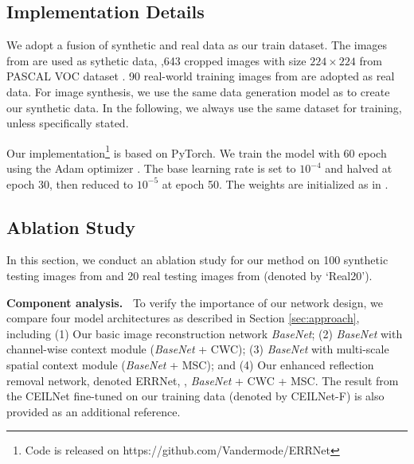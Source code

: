 \documentclass[10pt,twocolumn,letterpaper]{article}
\begin{document}
\subsection{Implementation Details} \label{sec:implement}
 We adopt a fusion of synthetic and real data as
our train dataset. The images from  \cite{fan2017generic} are used as
sythetic data, ,643 cropped images with size $224 \times 224$ from PASCAL
VOC dataset \cite{everingham2010pascal}. 90 real-world training images from
\cite{zhang2018single} are adopted as real data. For image synthesis, we use the
same data generation model as \cite{fan2017generic} to create our synthetic
data. In the following, we always use the same dataset for training, unless
specifically stated. 

\vspace{5pt}
 Our implementation\footnote{Code is released on https://github.com/Vandermode/ERRNet} is based on PyTorch. We train the model with 60
epoch using the Adam optimizer \cite{kingma2014adam}. The
base learning rate is set to $10^{-4}$ and halved at epoch 30, then reduced to
$10^{-5}$ at epoch 50. The weights are initialized as in
\cite{Lim_2017_CVPR_Workshops}.
 
\subsection{Ablation Study} \label{sec:com-analysis}



In this section, we conduct an ablation study for our method on 100 synthetic testing images from
 \cite{fan2017generic} and 20 real testing images from 
\cite{zhang2018single} (denoted by `Real20'). 



\vspace{5pt}
{\noindent \bf Component analysis.~} To verify the importance of our network
design, we compare four model architectures as described in Section
\ref{sec:approach}, including (1) Our basic image reconstruction network
\emph{BaseNet}; (2) \emph{BaseNet} with channel-wise context module (\emph{BaseNet} + CWC); (3) \emph{BaseNet} with multi-scale spatial context module (\emph{BaseNet} + MSC); and (4) Our enhanced reflection removal
network, denoted ERRNet,
\ie, \emph{BaseNet} + CWC + MSC. The result from the CEILNet \cite{fan2017generic} fine-tuned on our training
data (denoted by CEILNet-F) is also provided as an additional reference.
\end{document}
